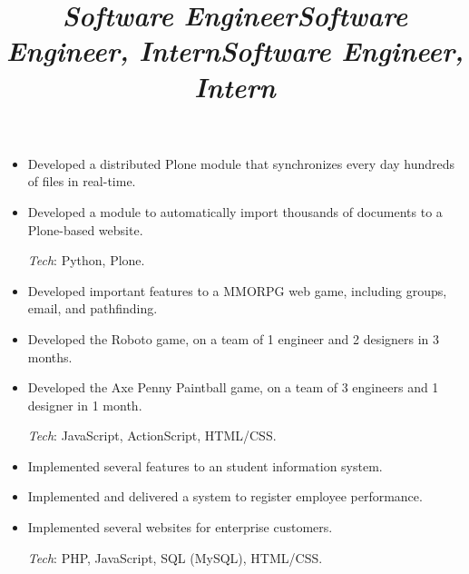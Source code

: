 \begin{resume}
\title{\emph{Software Engineer}}
\begin{position}
\vspace{1mm}
\begin{itemize}\small
\item Developed a distributed Plone module that synchronizes every day hundreds
  of files in real-time.
\item Developed a module to automatically import thousands of documents to a Plone-based website.

\vspace{1mm}
{\small \emph{Tech}: Python, Plone\@.}
\end{itemize}
\end{position}

\title{\emph{Software Engineer, Intern}}
\begin{position}
\vspace{1mm}
\begin{itemize}\small
\item Developed important features to a MMORPG web game, including groups,
  email, and pathfinding.
\item Developed the Roboto game, on a team of 1 engineer and 2 designers in
  3 months.
\item Developed the Axe Penny Paintball game, on a team of 3 engineers and
  1 designer in 1 month.

\vspace{1mm}
{\small \emph{Tech}: JavaScript, ActionScript, HTML/CSS\@.}
\end{itemize}
\end{position}

\title{\emph{Software Engineer, Intern}}
\begin{position}
\vspace{1mm}
\begin{itemize}\small
\item Implemented several features to an student information system.
\item Implemented and delivered a system to register employee performance.
\item Implemented several websites for enterprise customers.

\vspace{1mm}
{\small \emph{Tech}: PHP, JavaScript, SQL (MySQL), HTML/CSS\@.}
\end{itemize}
\end{position}


\end{resume}
